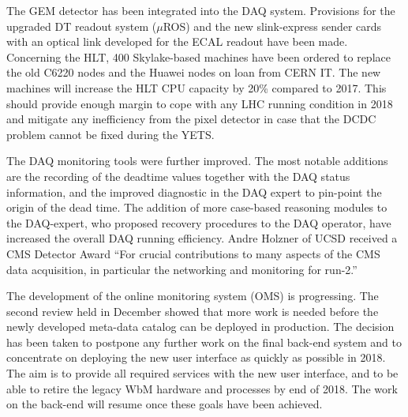 \documentclass[12pt]{article}
\begin{document}
The GEM detector has been integrated into the DAQ system. Provisions for the upgraded DT readout system ($\mu$ROS) and the new slink-express sender cards with an optical link developed for the ECAL readout have been made. Concerning the HLT, 400 Skylake-based machines have been ordered to replace the old C6220 nodes and the Huawei nodes on loan from CERN IT. The new machines will increase the HLT CPU capacity by 20\% compared to 2017. This should provide enough margin to cope with any LHC running condition in 2018 and mitigate any inefficiency from the pixel detector in case that the DCDC problem cannot be fixed during the YETS.

The DAQ monitoring tools were further improved. The most notable additions are the recording of the deadtime values together with the DAQ status information, and the improved diagnostic in the DAQ expert to pin-point the origin of the dead time. The addition of more case-based reasoning modules to the DAQ-expert, who proposed recovery procedures to the DAQ operator, have increased the overall DAQ running efficiency. 
Andre Holzner of UCSD received a CMS Detector Award ``For crucial contributions to many aspects of the CMS data acquisition, in particular the networking and monitoring for run-2.''

The development of the online monitoring system (OMS) is progressing. The second review held in December showed that more work is needed before the newly developed meta-data catalog can be deployed in production. The decision has been taken to postpone any further work on the final back-end system and to concentrate on deploying the new user interface as quickly as possible in 2018. The aim is to provide all required services with the new user interface, and to be able to retire the legacy WbM hardware and processes by end of 2018. The work on the back-end will resume once these goals have been achieved.
\end{document}
